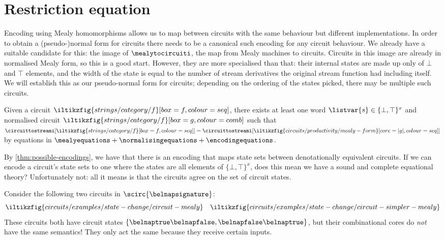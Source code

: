 \section{Restriction equation}

Encoding using Mealy homomorphisms allows us to map between circuits with the
same behaviour but different implementations.
In order to obtain a (pseudo-)normal form for circuits there needs to be a
canonical such encoding for any circuit behaviour.
We already have a suitable candidate for this: the image of
\(\mealytocircuiti\), the map from Mealy machines to circuits.
Circuits in this image are already in normalised Mealy form, so this is a good
start.
However, they are more specialised than that: their internal states are made up
only of \(\bot\) and \(\top\) elements, and the width of the state is equal to
the number of stream derivatives the original stream function had including
itself.
We will establish this as our pseudo-normal form for circuits; depending on the
ordering of the states picked, there may be multiple such circuits.

\begin{corollary}
    Given a circuit \(
    \iltikzfig{strings/category/f}[box=f,colour=seq]
    \), there exists at least one word \(\listvar{s} \in \{\bot,\top\}^x\) and
    normalised circuit \(
    \iltikzfig{strings/category/f}[box=g,colour=comb]
    \) such that \(
    \circuittostreami[\iltikzfig{strings/category/f}[box=f,colour=seq]]
    =
    \circuittostreami[\iltikzfig{circuits/productivity/mealy-form}[core=|g|,colour=seq]]
    \) by equations in \(
    \mealyequations + \normalisingequations + \encodingequations
    \).
\end{corollary}

By \cref{thm:possible-encodings}, we have that there is an encoding that maps
state sets between denotationally equivalent circuits.
If we can encode a circuit's state sets to one where the states are all elements
of \(\{\bot,\top\}^x\), does this mean we have a sound and complete equational
theory?
Unfortunately not: all it means is that the circuits agree on the set of
circuit states.

\begin{example}\label{ex:restriction-example}
    Consider the following two circuits in \(\scirc{\belnapsignature}\): \[
        \iltikzfig{circuits/examples/state-change/circuit-mealy}
        \quad
        \iltikzfig{circuits/examples/state-change/circuit-simpler-mealy}
    \]
    These circuits both have circuit states \(
    \{\belnaptrue\belnapfalse,\belnapfalse\belnaptrue\}
    \), but their combinational cores do \emph{not} have the same semantics!
    They only act the same because they receive certain inputs.
\end{example}

